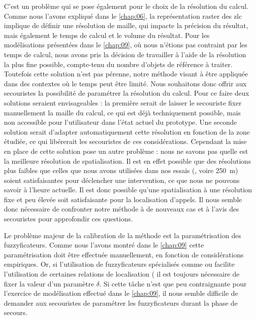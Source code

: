 C'est un problème qui se pose également pour le choix de la résolution
du calcul. Comme nous l'avons expliqué dans le \autoref{chap:06}, la
représentation raster des \ac{zlc} implique de définir une résolution
de maille, qui impacte la précision du résultat, mais également le
temps de calcul et le volume du résultat. Pour les modélisations
présentées dans le \autoref{chap:09}, où nous n'étions pas contraint
par les temps de calcul, nous avons pris la décision de travailler à
l'aide de la résolution la plus fine possible, compte-tenu du nombre
d'objets de référence à traiter. Toutefois cette solution n'est pas
pérenne, notre méthode visant à être appliquée dans des contextes où
le temps peut être limité. Nous souhaitons donc offrir aux secouristes
la possibilité de paramétrer la résolution du calcul. Pour ce faire
deux solutions seraient envisageables : la première serait de laisser
le secouriste fixer manuellement la maille du calcul, ce qui est déjà
techniquement possible, mais non accessible pour l'utilisateur dans
l'état actuel du prototype. Une seconde solution serait d'adapter
automatiquement cette résolution en fonction de la zone étudiée, ce
qui libérerait les secouristes de ces considérations. Cependant la
mise en place de cette solution pose un autre problème : nous ne
savons pas quelle est la meilleure résolution de spatialisation. Il
est en effet possible que des résolutions plus faibles que celles que
nous avons utilisées dans nos essais (, voire 250~m) soient
satisfaisantes pour déclencher une intervention, ce que nous ne
pouvons savoir à l'heure actuelle. Il est donc possible qu'une
spatialisation à une résolution fixe et peu élevée soit satisfaisante
pour la localisation d'appels. Il nous semble donc nécessaire de
confronter notre méthode à de nouveaux cas et à l'avis des secouristes
pour approfondir ces questions.

Le problème majeur de la calibration de la méthode est la
paramétrisation des fuzzyficateurs. Comme nous l'avons montré dans le
\autoref{chap:09} cette paramétrisation doit être effectuée
manuellement, en fonction de considérations empiriques. Or, si
l'utilisation de fuzzyficateurs spécialisés comme
 ou  facilite
l'utilisation de certaines relations de localisation (\eg
{} il est toujours nécessaire de fixer la valeur
d'un paramètre \(\delta\). Si cette tâche n'est que peu contraignante
pour l'exercice de modélisation effectué dans le \autoref{chap:09}, il
nous semble difficile de demander aux secouristes de paramétrer les
fuzzyficateurs durant la phase de secours.

